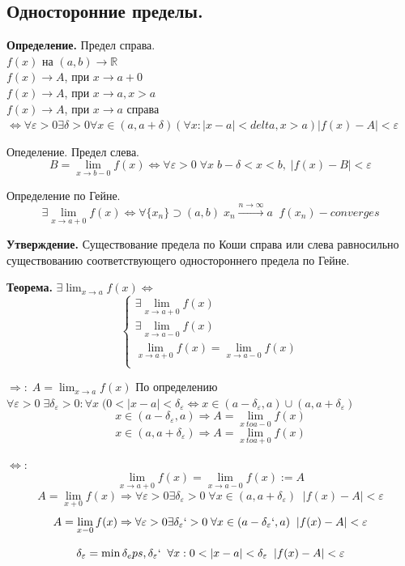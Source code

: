\documentclass[12pt, a4paper]{article}
\newcommand{\R}{\mathbb{R}}
\newcommand{\eps}{\varepsilon}
\begin{document}
\subsection{Односторонние пределы.}


\begin{tcolorbox}
	\textbf{Определение. }Предел справа.\\
	$f(x)$ на $(a, b) \to \R$\\
	$ f(x) \to A$, при $x \to a + 0$\\
	$ f(x) \to A$, при $x \to a, x > a$ \\
	$f(x) \to A$, при $x \to a$ справа $\Leftrightarrow \forall \eps > 0 \exists \delta > 0 \forall x \in (a, a+ \delta) (\forall x: |x-a| < delta, x > a) |f(x) - A| < \eps$
\end{tcolorbox}

\begin{tcolorbox}
	Опеделение. Предел слева.
	\[ B = \lim_{x \to b-0} f(x) \Leftrightarrow \forall \eps > 0\; \forall x\; b - \delta < x < b,\; |f(x) - B| < \eps \]
\end{tcolorbox}

\begin{tcolorbox}
	Определение по Гейне. 
	\[ \exists \lim_{x \to a + 0} f(x) \Leftrightarrow \forall \{x_n\} \supset (a, b)\; x_n \xrightarrow[]{n\to \infty} a \;\; {f(x_n)} - converges \]
\end{tcolorbox}

\textbf{Утверждение.} Существование предела по Коши справа или слева равносильно существованию соответствующего одностороннего предела по Гейне.

\textbf{Теорема.} $\exists \lim_{x \to a} f(x) \Leftrightarrow$ 
\[
\begin{cases}
	\exists \lim_{x \to a + 0} f(x)\\
	\exists \lim_{x \to a - 0} f(x)\\
	\lim_{x \to a + 0} f(x) = \lim_{x \to a - 0} f(x)\\
\end{cases} 
\]
\begin{tcolorbox}[title=Доказательство]
	$\Rightarrow:\; A = \lim_{x \to a} f(x)$ По определению $\forall \eps > 0\; \exists \delta_\eps > 0: \forall x\; (0 < |x - a| < \delta_\eps \Leftrightarrow x \in (a - \delta_\eps, a) \cup (a, a + \delta_\eps)$
	\[ x \in (a - \delta_\eps, a) \Rightarrow A = \lim_{x \ to a -0} f(x) \]
	\[ x \in (a, a + \delta_\eps) \Rightarrow A = \lim_{x \ to a + 0} f(x) \]

	$\Leftrightarrow:$ 
	\[ \lim_{x \to a + 0} f(x) = \lim_{x \to a - 0} f(x) := A\]
	\[ A=  \lim_{x + 0} f(x) \Rightarrow \forall \eps > 0 \exists \delta_\eps > 0\; \forall x \in (a, a + \delta_\eps) \;\; |f(x) - A| < \eps \]
	\[ A = \lim_{x - 0} f(x) \Rightarrow \forall \eps > 0 \exists \delta_\eps` > 0\; \forall x \in (a - \delta_\eps`, a) \;\; |f(x) - A| < \eps \]

	\[ \delta_\eps = \min{\delta_eps, \delta_\eps`} \;\; \forall x: 0 < |x - a| < \delta_\eps\;\; |f(x) - A| < \eps \]
\end{tcolorbox}
\end{document}
